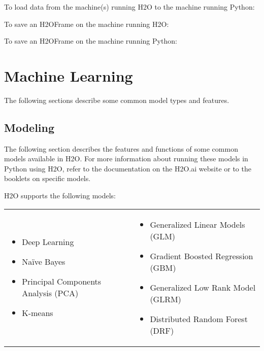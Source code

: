 {To load data from the machine(s) running H2O to the machine running Python:


To save an H2OFrame on the machine running H2O:


To save an H2OFrame on the machine running Python:


\section{Machine Learning}

The following sections describe some common model types and features. 

\subsection{Modeling}
The following section describes the features and functions of some common models available in H2O.  For more information about running these models in Python using H2O, refer to the documentation on
the H2O.ai website or to the booklets on specific models.


H2O supports the following models:  

\begin{frame}%

\begin{tabular}{p{5.0cm}p{6.0cm}}

\begin{itemize}
  \item Deep Learning
  \item Na\"{i}ve Bayes
  \item Principal Components Analysis (PCA)
  \item K-means
\end{itemize} &

\begin{itemize}
  \item Generalized Linear Models (GLM) 
  \item Gradient Boosted Regression (GBM)
  \item Generalized Low Rank Model (GLRM)
  \item Distributed Random Forest (DRF)
\end{itemize}


\end{tabular}
\end{frame}}
